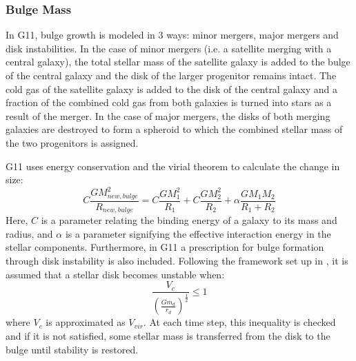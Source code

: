 \documentclass[a4paper,fleqn,usenatbib]{mnras}
\begin{document}
\subsubsection{Bulge Mass} \label{mdf: db_sam_bulge}


\par
In G11, bulge growth is modeled in 3 ways: minor mergers, major mergers and disk instabilities. In the case of minor mergers (i.e. a satellite merging with a  central galaxy), the total stellar mass of the satellite galaxy is added to the bulge of the central galaxy and the disk of the larger progenitor remains intact. The cold gas of the satellite galaxy is added to the disk of the central galaxy and a fraction of the combined cold gas from both galaxies is turned into stars as a result of the merger. In the case of major mergers, the disks of both merging galaxies are destroyed to  form a spheroid to which the combined stellar mass of the two progenitors is assigned. 

\par G11 uses energy conservation and the virial theorem to calculate the change in size:
\begin{equation}
C\frac{GM_{new,bulge}^2}{R_{new,bulge}} = C\frac{GM_{1}^2}{R_{1}} + C\frac{GM_{2}^2}{R_{2}} + \alpha\frac{GM_{1}M_{2}}{R_{1} + R_2}
\end{equation}
Here, $C$ is a parameter relating the binding energy of a galaxy to its mass and radius, and $\alpha$ is a parameter signifying the effective interaction energy in the stellar components.
Furthermore, in G11 a prescription for bulge formation through disk instability is also included. Following the framework set up in \citet{mo1998formation}, it is assumed that a stellar disk becomes unstable when:
\begin{equation}
\frac{V_c}{(\frac{Gm_d}{r_d})^{\frac{1}{2}}} \leq 1
\end{equation}
where $V_c$ is approximated as $V_{vir}$. At each time step, this inequality is checked and if it is not satisfied, some stellar mass is transferred from the disk to the bulge until stability is restored. 
\end{document}
